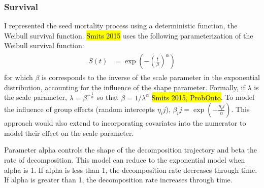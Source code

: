 \documentclass[12pt, oneside, titlepage]{article}   	%
\begin{document}
\subsubsection{Survival}

I represented the seed mortality process using a deterministic function, the Weibull survival function. \hl{Smits 2015} uses the following parameterization of the Weibull survival function:
%
\begin{align}
  \begin{split}
S(t) & = \exp(- (\frac{t}{\beta})^\alpha)
  \end{split}
\end{align}
%
for which $\beta$ is corresponds to the inverse of the scale parameter in the exponential distribution, accounting for the influence of the shape parameter. Formally, if $\lambda$ is the scale parameter, $\lambda=\beta^{-\frac{1}{\alpha}}$ so that $\beta= 1/\lambda^\alpha$ \hl{Smits 2015, ProbOnto}. To model the influence of group effects (random intercepts $\eta_ij$), $\beta_ij =  \exp(-\frac{\eta_ij}{\alpha})$. This approach would also extend to incorporating covariates into the numerator to model their effect on the scale parameter. 

Parameter alpha controls the shape of the decomposition trajectory and beta the rate of decomposition. This model can reduce to the exponential model when alpha is 1. If alpha is less than 1, the decomposition rate decreases through time. If alpha is greater than 1, the decomposition rate increases through time.
\end{document}
